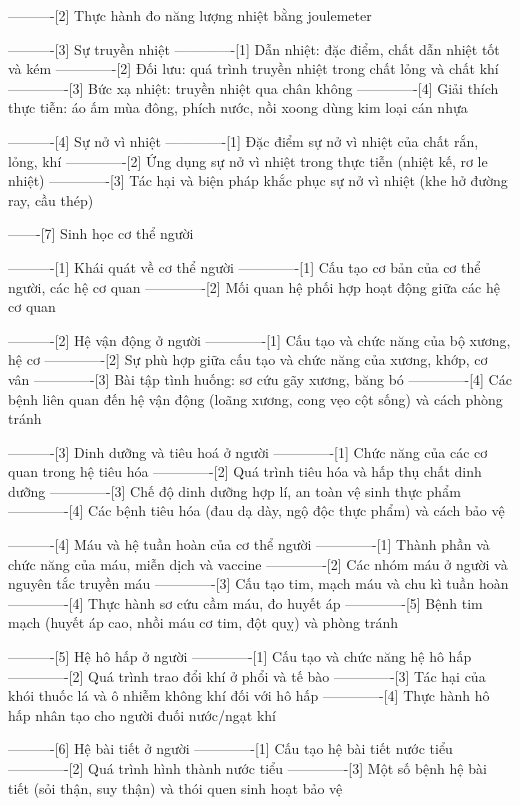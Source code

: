 ----------[2] Thực hành đo năng lượng nhiệt bằng joulemeter

----------[3] Sự truyền nhiệt
-------------[1] Dẫn nhiệt: đặc điểm, chất dẫn nhiệt tốt và kém
-------------[2] Đối lưu: quá trình truyền nhiệt trong chất lỏng và chất khí
-------------[3] Bức xạ nhiệt: truyền nhiệt qua chân không
-------------[4] Giải thích thực tiễn: áo ấm mùa đông, phích nước, nồi xoong dùng kim loại cán nhựa

----------[4] Sự nở vì nhiệt
-------------[1] Đặc điểm sự nở vì nhiệt của chất rắn, lỏng, khí
-------------[2] Ứng dụng sự nở vì nhiệt trong thực tiễn (nhiệt kế, rơ le nhiệt)
-------------[3] Tác hại và biện pháp khắc phục sự nở vì nhiệt (khe hở đường ray, cầu thép)

-------[7] Sinh học cơ thể người

----------[1] Khái quát về cơ thể người
-------------[1] Cấu tạo cơ bản của cơ thể người, các hệ cơ quan
-------------[2] Mối quan hệ phối hợp hoạt động giữa các hệ cơ quan

----------[2] Hệ vận động ở người
-------------[1] Cấu tạo và chức năng của bộ xương, hệ cơ
-------------[2] Sự phù hợp giữa cấu tạo và chức năng của xương, khớp, cơ vân
-------------[3] Bài tập tình huống: sơ cứu gãy xương, băng bó
-------------[4] Các bệnh liên quan đến hệ vận động (loãng xương, cong vẹo cột sống) và cách phòng tránh

----------[3] Dinh dưỡng và tiêu hoá ở người
-------------[1] Chức năng của các cơ quan trong hệ tiêu hóa
-------------[2] Quá trình tiêu hóa và hấp thụ chất dinh dưỡng
-------------[3] Chế độ dinh dưỡng hợp lí, an toàn vệ sinh thực phẩm
-------------[4] Các bệnh tiêu hóa (đau dạ dày, ngộ độc thực phẩm) và cách bảo vệ

----------[4] Máu và hệ tuần hoàn của cơ thể người
-------------[1] Thành phần và chức năng của máu, miễn dịch và vaccine
-------------[2] Các nhóm máu ở người và nguyên tắc truyền máu
-------------[3] Cấu tạo tim, mạch máu và chu kì tuần hoàn
-------------[4] Thực hành sơ cứu cầm máu, đo huyết áp
-------------[5] Bệnh tim mạch (huyết áp cao, nhồi máu cơ tim, đột quỵ) và phòng tránh

----------[5] Hệ hô hấp ở người
-------------[1] Cấu tạo và chức năng hệ hô hấp
-------------[2] Quá trình trao đổi khí ở phổi và tế bào
-------------[3] Tác hại của khói thuốc lá và ô nhiễm không khí đối với hô hấp
-------------[4] Thực hành hô hấp nhân tạo cho người đuối nước/ngạt khí

----------[6] Hệ bài tiết ở người
-------------[1] Cấu tạo hệ bài tiết nước tiểu
-------------[2] Quá trình hình thành nước tiểu
-------------[3] Một số bệnh hệ bài tiết (sỏi thận, suy thận) và thói quen sinh hoạt bảo vệ

